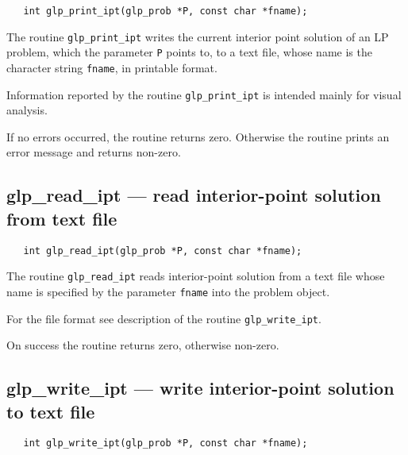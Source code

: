 \synopsis

\begin{verbatim}
   int glp_print_ipt(glp_prob *P, const char *fname);
\end{verbatim}

\description

The routine \verb|glp_print_ipt| writes the current interior point
solution  of an LP problem, which the parameter \verb|P| points to, to
a text file, whose name is the character string \verb|fname|, in
printable format.

Information reported by the routine \verb|glp_print_ipt| is intended
mainly for visual analysis.

\newpage

\returns

If no errors occurred, the routine returns zero. Otherwise the routine
prints an error message and returns non-zero.

\subsection{glp\_read\_ipt --- read interior-point solution from text
file}

\synopsis

\begin{verbatim}
   int glp_read_ipt(glp_prob *P, const char *fname);
\end{verbatim}

\description

The routine \verb|glp_read_ipt| reads interior-point solution from
a text file whose name is specified by the parameter \verb|fname| into
the problem object.

For the file format see description of the routine
\verb|glp_write_ipt|.

\returns

On success the routine returns zero, otherwise non-zero.

\subsection{glp\_write\_ipt --- write interior-point solution to text
file}

\synopsis

\begin{verbatim}
   int glp_write_ipt(glp_prob *P, const char *fname);
\end{verbatim}

\description

